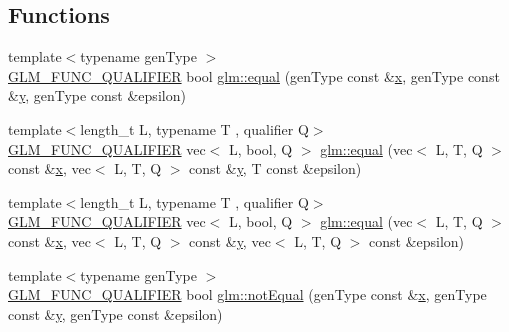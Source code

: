 \subsection*{Functions}
\begin{DoxyCompactItemize}
\item 
{\footnotesize template$<$typename gen\+Type $>$ }\\\mbox{\hyperlink{setup_8hpp_a33fdea6f91c5f834105f7415e2a64407}{G\+L\+M\+\_\+\+F\+U\+N\+C\+\_\+\+Q\+U\+A\+L\+I\+F\+I\+ER}} bool \mbox{\hyperlink{group__ext__vector__relational_gac4ae021e79693174e4de6560d159b33a}{glm\+::equal}} (gen\+Type const \&\mbox{\hyperlink{_s_d_l__opengl_8h_ad0e63d0edcdbd3d79554076bf309fd47}{x}}, gen\+Type const \&\mbox{\hyperlink{_s_d_l__opengl_8h_a1675d9d7bb68e1657ff028643b4037e3}{y}}, gen\+Type const \&epsilon)
\item 
{\footnotesize template$<$length\+\_\+t L, typename T , qualifier Q$>$ }\\\mbox{\hyperlink{setup_8hpp_a33fdea6f91c5f834105f7415e2a64407}{G\+L\+M\+\_\+\+F\+U\+N\+C\+\_\+\+Q\+U\+A\+L\+I\+F\+I\+ER}} vec$<$ L, bool, Q $>$ \mbox{\hyperlink{group__ext__vector__relational_gae630b1f87fbd3b762ca46b0b8b32b02e}{glm\+::equal}} (vec$<$ L, T, Q $>$ const \&\mbox{\hyperlink{_s_d_l__opengl_8h_ad0e63d0edcdbd3d79554076bf309fd47}{x}}, vec$<$ L, T, Q $>$ const \&\mbox{\hyperlink{_s_d_l__opengl_8h_a1675d9d7bb68e1657ff028643b4037e3}{y}}, T const \&epsilon)
\item 
{\footnotesize template$<$length\+\_\+t L, typename T , qualifier Q$>$ }\\\mbox{\hyperlink{setup_8hpp_a33fdea6f91c5f834105f7415e2a64407}{G\+L\+M\+\_\+\+F\+U\+N\+C\+\_\+\+Q\+U\+A\+L\+I\+F\+I\+ER}} vec$<$ L, bool, Q $>$ \mbox{\hyperlink{group__ext__vector__relational_ga6fb2432528edd028e3c2cf5b78d99797}{glm\+::equal}} (vec$<$ L, T, Q $>$ const \&\mbox{\hyperlink{_s_d_l__opengl_8h_ad0e63d0edcdbd3d79554076bf309fd47}{x}}, vec$<$ L, T, Q $>$ const \&\mbox{\hyperlink{_s_d_l__opengl_8h_a1675d9d7bb68e1657ff028643b4037e3}{y}}, vec$<$ L, T, Q $>$ const \&epsilon)
\item 
{\footnotesize template$<$typename gen\+Type $>$ }\\\mbox{\hyperlink{setup_8hpp_a33fdea6f91c5f834105f7415e2a64407}{G\+L\+M\+\_\+\+F\+U\+N\+C\+\_\+\+Q\+U\+A\+L\+I\+F\+I\+ER}} bool \mbox{\hyperlink{group__ext__vector__relational_ga27c5118811bcfed5504e50f22693373e}{glm\+::not\+Equal}} (gen\+Type const \&\mbox{\hyperlink{_s_d_l__opengl_8h_ad0e63d0edcdbd3d79554076bf309fd47}{x}}, gen\+Type const \&\mbox{\hyperlink{_s_d_l__opengl_8h_a1675d9d7bb68e1657ff028643b4037e3}{y}}, gen\+Type const \&epsilon)

\end{DoxyCompactItemize}
